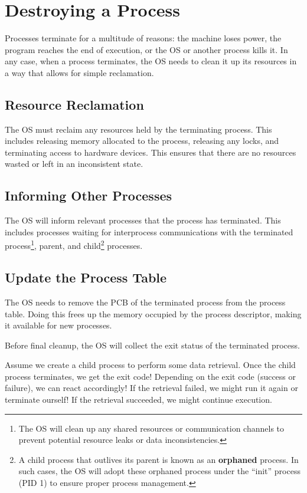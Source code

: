 \documentclass{report}
\newcommand{\exampleBegin}[1]{\begin{tcolorbox}[colback=blue!5!white,colframe=black!75!blue,title={Example:
      #1}]}
\newcommand{\exampleEnd}{\end{tcolorbox}}
\begin{document}
\section{Destroying a Process}
Processes terminate for a multitude of reasons: the machine loses power, the program reaches the end of
execution, or the OS or another process kills it. In any case, when a process terminates, the OS
needs to clean it up its resources in a way that allows for simple reclamation.


\subsection{Resource Reclamation}
The OS must reclaim any resources held by the terminating process. This includes releasing memory
allocated to the process, releasing any locks, and terminating access to hardware devices. This
ensures that there are no resources wasted or left in an inconsistent state.


\subsection{Informing Other Processes}
The OS will inform relevant processes that the process has terminated. This includes processes
waiting for interprocess communications with the terminated process\footnote{The OS will clean up
  any shared resources or communication channels to prevent potential resource leaks or data
  inconsistencies.}, parent, and child\footnote{A child process that outlives its parent is known as
  an \textbf{orphaned} process. In such cases, the OS will adopt these orphaned process under the
  ``init'' process (PID 1) to ensure proper process management.} processes.  


\subsection{Update the Process Table}
The OS needs to remove the PCB of the terminated process from the process table. Doing this frees up
the memory occupied by the process descriptor, making it available for new processes.


Before final cleanup, the OS will collect the exit status of the terminated process.

\exampleBegin{How'd You Exit?}
Assume we create a child process to perform some data retrieval. Once the child process terminates,
we get the exit code! Depending on the exit code (success or failure), we can react accordingly! If
the retrieval failed, we might run it again or terminate ourself! If the retrieval succeeded, we
might continue execution.
\exampleEnd
\end{document}
